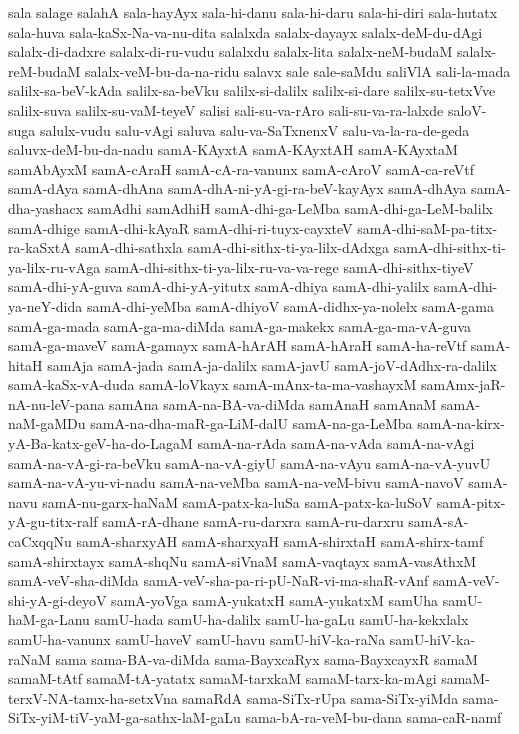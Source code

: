 {sala
salage
salahA
sala-hayAyx
sala-hi-danu
sala-hi-daru
sala-hi-diri
sala-hutatx
sala-huva
sala-kaSx-Na-va-nu-dita
salalxda
salalx-dayayx
salalx-deM-du-dAgi
salalx-di-dadxre
salalx-di-ru-vudu
salalxdu
salalx-lita
salalx-neM-budaM
salalx-reM-budaM
salalx-veM-bu-da-na-ridu
salavx
sale
sale-saMdu
saliVlA
sali-la-mada
salilx-sa-beV-kAda
salilx-sa-beVku
salilx-si-dalilx
salilx-si-dare
salilx-su-tetxVve
salilx-suva
salilx-su-vaM-teyeV
salisi
sali-su-va-rAro
sali-su-va-ra-lalxde
saloV-suga
salulx-vudu
salu-vAgi
saluva
salu-va-SaTxnenxV
salu-va-la-ra-de-geda
saluvx-deM-bu-da-nadu
samA-KAyxtA
samA-KAyxtAH
samA-KAyxtaM
samAbAyxM
samA-cAraH
samA-cA-ra-vanunx
samA-cAroV
samA-ca-reVtf
samA-dAya
samA-dhAna
samA-dhA-ni-yA-gi-ra-beV-kayAyx
samA-dhAya
samA-dha-yashacx
samAdhi
samAdhiH
samA-dhi-ga-LeMba
samA-dhi-ga-LeM-balilx
samA-dhige
samA-dhi-kAyaR
samA-dhi-ri-tuyx-cayxteV
samA-dhi-saM-pa-titx-ra-kaSxtA
samA-dhi-sathxla
samA-dhi-sithx-ti-ya-lilx-dAdxga
samA-dhi-sithx-ti-ya-lilx-ru-vAga
samA-dhi-sithx-ti-ya-lilx-ru-va-va-rege
samA-dhi-sithx-tiyeV
samA-dhi-yA-guva
samA-dhi-yA-yitutx
samA-dhiya
samA-dhi-yalilx
samA-dhi-ya-neY-dida
samA-dhi-yeMba
samA-dhiyoV
samA-didhx-ya-nolelx
samA-gama
samA-ga-mada
samA-ga-ma-diMda
samA-ga-makekx
samA-ga-ma-vA-guva
samA-ga-maveV
samA-gamayx
samA-hArAH
samA-hAraH
samA-ha-reVtf
samA-hitaH
samAja
samA-jada
samA-ja-dalilx
samA-javU
samA-joV-dAdhx-ra-dalilx
samA-kaSx-vA-duda
samA-loVkayx
samA-mAnx-ta-ma-vashayxM
samAmx-jaR-nA-nu-leV-pana
samAna
samA-na-BA-va-diMda
samAnaH
samAnaM
samA-naM-gaMDu
samA-na-dha-maR-ga-LiM-dalU
samA-na-ga-LeMba
samA-na-kirx-yA-Ba-katx-geV-ha-do-LagaM
samA-na-rAda
samA-na-vAda
samA-na-vAgi
samA-na-vA-gi-ra-beVku
samA-na-vA-giyU
samA-na-vAyu
samA-na-vA-yuvU
samA-na-vA-yu-vi-nadu
samA-na-veMba
samA-na-veM-bivu
samA-navoV
samA-navu
samA-nu-garx-haNaM
samA-patx-ka-luSa
samA-patx-ka-luSoV
samA-pitx-yA-gu-titx-ralf
samA-rA-dhane
samA-ru-darxra
samA-ru-darxru
samA-sA-caCxqqNu
samA-sharxyAH
samA-sharxyaH
samA-shirxtaH
samA-shirx-tamf
samA-shirxtayx
samA-shqNu
samA-siVnaM
samA-vaqtayx
samA-vasAthxM
samA-veV-sha-diMda
samA-veV-sha-pa-ri-pU-NaR-vi-ma-shaR-vAnf
samA-veV-shi-yA-gi-deyoV
samA-yoVga
samA-yukatxH
samA-yukatxM
samUha
samU-haM-ga-Lanu
samU-hada
samU-ha-dalilx
samU-ha-gaLu
samU-ha-kekxlalx
samU-ha-vanunx
samU-haveV
samU-havu
samU-hiV-ka-raNa
samU-hiV-ka-raNaM
sama
sama-BA-va-diMda
sama-BayxcaRyx
sama-BayxcayxR
samaM
samaM-tAtf
samaM-tA-yatatx
samaM-tarxkaM
samaM-tarx-ka-mAgi
samaM-terxV-NA-tamx-ha-setxVna
samaRdA
sama-SiTx-rUpa
sama-SiTx-yiMda
sama-SiTx-yiM-tiV-yaM-ga-sathx-laM-gaLu
sama-bA-ra-veM-bu-dana
sama-caR-namf
}

